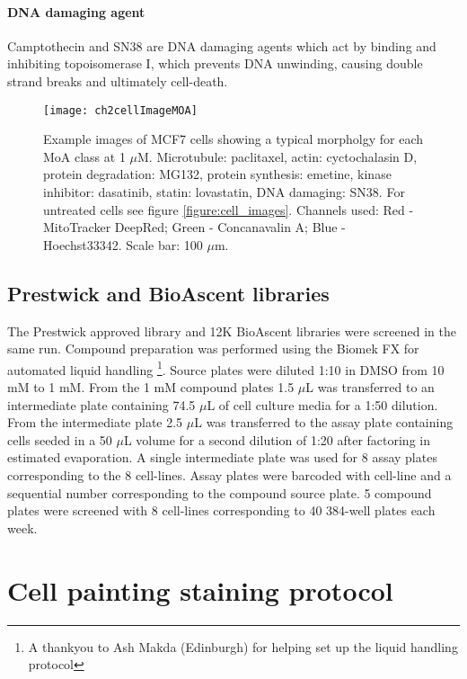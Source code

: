 \documentclass[a4paper,11pt,twoside,openright]{scrbook}
\begin{document}
\paragraph{DNA damaging agent}
Camptothecin and SN38 are DNA damaging agents which act by binding and inhibiting topoisomerase I, which prevents DNA 
unwinding, causing double strand breaks and ultimately cell-death.

\begin{figure}
    \centering
    \texttt{[image: ch2cellImageMOA]}
    \captionsetup{width=0.8\textwidth}
    \caption[Example images of MCF7 cells for each MoA class]{
        Example images of MCF7 cells showing a typical morpholgy for each MoA class at 1 $\mu$M.
        Microtubule: paclitaxel, actin: cyctochalasin D, protein degradation: MG132, protein synthesis: emetine, kinase 
inhibitor: dasatinib, statin: lovastatin, DNA damaging: SN38.
        For untreated cells see figure \ref{figure:cell_images}.
        Channels used: Red - MitoTracker DeepRed; Green - Concanavalin A; Blue - Hoechst33342. Scale bar: 100 $\mu$m.
    }
    \label{figure:cell_images_moa}
\end{figure}


\subsection{Prestwick and BioAscent libraries}

The Prestwick approved library and 12K BioAscent libraries were screened in the same run.
Compound preparation was performed using the Biomek FX for automated liquid handling \footnote{A thankyou to Ash Makda 
(Edinburgh) for helping set up the liquid handling protocol}.
Source plates were diluted 1:10 in DMSO from 10 mM to 1 mM.
From the 1 mM compound plates 1.5 $\mu$L was transferred to an intermediate plate containing 74.5 $\mu$L of cell 
culture media for a 1:50 dilution.
From the intermediate plate 2.5 $\mu$L was transferred to the assay plate containing cells seeded in a 50 $\mu$L volume 
for a second dilution of 1:20 after factoring in estimated evaporation.
A single intermediate plate was used for 8 assay plates corresponding to the 8 cell-lines.
Assay plates were barcoded with cell-line and a sequential number corresponding to the compound source plate.
5 compound plates were screened with 8 cell-lines corresponding to 40 384-well plates each week.


\section{Cell painting staining protocol}
\end{document}
